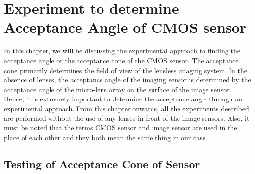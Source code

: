 \chapter{Experiment to determine Acceptance Angle of CMOS sensor}
\label{chp:Experiment_FOV}
In this chapter, we will be discussing the experimental approach to finding the acceptance angle or the acceptance cone of the CMOS sensor. The acceptance cone primarily determines the field of view of the lensless imaging system. In the absence of lenses, the acceptance angle of the imaging sensor is determined by the acceptance angle of the micro-lens array on the surface of the image sensor. Hence, it is extremely important to determine the acceptance angle through an experimental approach. From this chapter onwards, all the experiments described are performed without the use of any lenses in front of the image sensors. Also, it must be noted that the terms CMOS sensor and image sensor are used in the place of each other and they both mean the same thing in our case.
\section{Testing of Acceptance Cone of Sensor}
